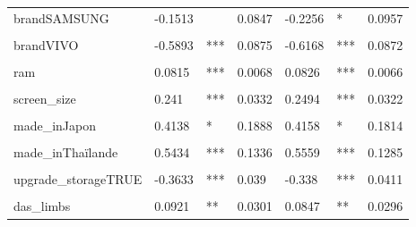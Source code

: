 \documentclass[
  12pt,
]{report}
\begin{document}
\begin{table}[!h]
\begin{tabular}[t]{lllllll}
brandSAMSUNG & -0.1513 &  & 0.0847 & -0.2256 & * & 0.0957\\
\cellcolor{gray!10}{brandSONY} & \cellcolor{gray!10}{-0.356} & \cellcolor{gray!10}{**} & \cellcolor{gray!10}{0.1154} & \cellcolor{gray!10}{-0.3962} & \cellcolor{gray!10}{***} & \cellcolor{gray!10}{0.1146}\\
brandVIVO & -0.5893 & *** & 0.0875 & -0.6168 & *** & 0.0872\\
\cellcolor{gray!10}{brandXIAOMI} & \cellcolor{gray!10}{-0.7591} & \cellcolor{gray!10}{***} & \cellcolor{gray!10}{0.0561} & \cellcolor{gray!10}{-0.7829} & \cellcolor{gray!10}{***} & \cellcolor{gray!10}{0.0578}\\
\addlinespace
ram & 0.0815 & *** & 0.0068 & 0.0826 & *** & 0.0066\\
\cellcolor{gray!10}{inductionTRUE} & \cellcolor{gray!10}{0.2724} & \cellcolor{gray!10}{***} & \cellcolor{gray!10}{0.0365} & \cellcolor{gray!10}{0.2857} & \cellcolor{gray!10}{***} & \cellcolor{gray!10}{0.0375}\\
screen\_size & 0.241 & *** & 0.0332 & 0.2494 & *** & 0.0322\\
\cellcolor{gray!10}{made\_inInde} & \cellcolor{gray!10}{-0.2249} & \cellcolor{gray!10}{} & \cellcolor{gray!10}{0.2332} & \cellcolor{gray!10}{-0.151} & \cellcolor{gray!10}{} & \cellcolor{gray!10}{0.2258}\\
made\_inJapon & 0.4138 & * & 0.1888 & 0.4158 & * & 0.1814\\
\addlinespace
\cellcolor{gray!10}{made\_inTaïwan} & \cellcolor{gray!10}{0.4755} & \cellcolor{gray!10}{*} & \cellcolor{gray!10}{0.2336} & \cellcolor{gray!10}{0.5101} & \cellcolor{gray!10}{*} & \cellcolor{gray!10}{0.2233}\\
made\_inThaïlande & 0.5434 & *** & 0.1336 & 0.5559 & *** & 0.1285\\
\cellcolor{gray!10}{made\_inViêt Nam} & \cellcolor{gray!10}{-0.1489} & \cellcolor{gray!10}{**} & \cellcolor{gray!10}{0.0531} & \cellcolor{gray!10}{-0.1071} & \cellcolor{gray!10}{} & \cellcolor{gray!10}{0.0576}\\
upgrade\_storageTRUE & -0.3633 & *** & 0.039 & -0.338 & *** & 0.0411\\
\cellcolor{gray!10}{das\_head} & \cellcolor{gray!10}{-0.209} & \cellcolor{gray!10}{***} & \cellcolor{gray!10}{0.0612} & \cellcolor{gray!10}{-0.2046} & \cellcolor{gray!10}{***} & \cellcolor{gray!10}{0.0587}\\
\addlinespace
das\_limbs & 0.0921 & ** & 0.0301 & 0.0847 & ** & 0.0296\\

\end{tabular}
\end{table}
\end{document}
